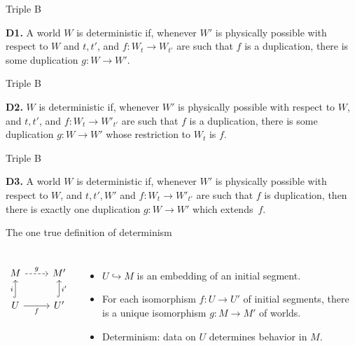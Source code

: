 \documentclass[fleqn]{beamer}
\begin{document}
\begin{frame}{Triple B}

  \textbf{D1.} A world $W$ is deterministic if, whenever $W'$ is
  physically possible with respect to $W$ and $t,t'$, and
  $f:W_t\to W_{t'}$ are such that $f$ is a duplication, there is some
  duplication $g:W\to W'$.

\end{frame}

\begin{frame}{Triple B}

  \textbf{D2.}  $W$ is deterministic if, whenever $W'$ is physically
  possible with respect to $W$, and $t,t'$, and $f:W_t\to W'_{t'}$ are
  such that $f$ is a duplication, there is some duplication
  $g:W\to W'$ whose restriction to $W_t$ is $f$.

\end{frame}

\begin{frame}{Triple B}

  \textbf{D3.} A world $W$ is deterministic if, whenever $W'$ is physically
  possible with respect to $W$, and $t,t',W'$ and $f:W_t\to W'_{t'}$
  are such that $f$ is duplication, then there is exactly one
  duplication $g:W\to W'$ which extends~$f$. \citep{belot}


\end{frame}

\begin{frame}[fragile]{The one true definition of determinism}

\begin{columns}[c]  %

  {\Large
  \[
  \begin{tikzcd}
    M \arrow[r, "g", dashed] & M' \\
    U \arrow[u, hookrightarrow, "i"] \arrow[r, "f"'] & U' \arrow[u,
    hookrightarrow, "i'"']
  \end{tikzcd}
  \]
  }

  \begin{itemize}
  \item $U \hookrightarrow M$ is an embedding of an initial segment.
  \item For each isomorphism $f:U\to U'$ of initial segments, there is
    a unique isomorphism $g:M\to M'$ of worlds.
  \item Determinism: data on $U$ determines behavior in $M$.
  \end{itemize}

\end{columns}





\end{frame}
\end{document}
